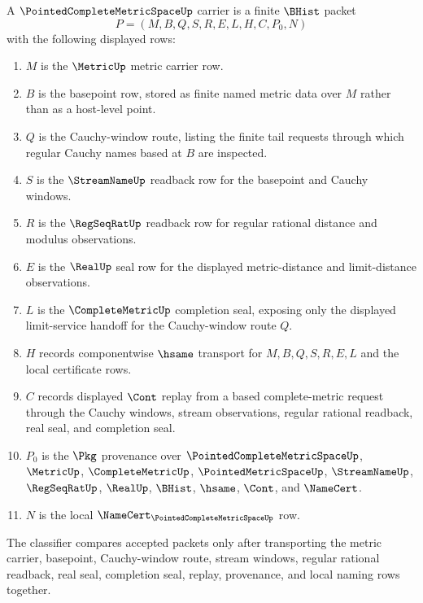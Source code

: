 \begin{definition}
\label{def:pointed-complete-metric-space-carrier}
A $\PointedCompleteMetricSpaceUp$ carrier is a finite $\BHist$ packet
$$
P=(M,B,Q,S,R,E,L,H,C,P_0,N)
$$
with the following displayed rows:
\begin{enumerate}
\item $M$ is the $\MetricUp$ metric carrier row.
\item $B$ is the basepoint row, stored as finite named metric data over $M$
rather than as a host-level point.
\item $Q$ is the Cauchy-window route, listing the finite tail requests through
which regular Cauchy names based at $B$ are inspected.
\item $S$ is the $\StreamNameUp$ readback row for the basepoint and Cauchy
windows.
\item $R$ is the $\RegSeqRatUp$ readback row for regular rational distance
and modulus observations.
\item $E$ is the $\RealUp$ seal row for the displayed metric-distance and
limit-distance observations.
\item $L$ is the $\CompleteMetricUp$ completion seal, exposing only the
displayed limit-service handoff for the Cauchy-window route $Q$.
\item $H$ records componentwise $\hsame$ transport for
$M,B,Q,S,R,E,L$ and the local certificate rows.
\item $C$ records displayed $\Cont$ replay from a based complete-metric
request through the Cauchy windows, stream observations, regular rational
readback, real seal, and completion seal.
\item $P_0$ is the $\Pkg$ provenance over $\PointedCompleteMetricSpaceUp$,
$\MetricUp$, $\CompleteMetricUp$, $\PointedMetricSpaceUp$, $\StreamNameUp$,
$\RegSeqRatUp$, $\RealUp$, $\BHist$, $\hsame$, $\Cont$, and $\NameCert$.
\item $N$ is the local $\NameCert_{\PointedCompleteMetricSpaceUp}$ row.
\end{enumerate}
The classifier compares accepted packets only after transporting the metric
carrier, basepoint, Cauchy-window route, stream windows, regular rational
readback, real seal, completion seal, replay, provenance, and local naming
rows together.
\end{definition}

